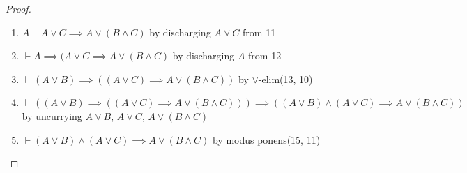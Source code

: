 \begin{proof}
\begin{enumerate}
\item $A\vdash A\lor C\implies A\lor(B\land C)$ by discharging $A\lor C$ from 11%
\item $\vdash A\implies(A\lor C\implies A\lor(B\land C)$ by
  discharging $A$ from 12%
\item $\vdash (A\lor B)\implies((A\lor C)\implies A\lor(B\land C))$ by
  $\lor$-elim(13, 10)%
\item $\vdash ((A\lor B)\implies((A\lor C)\implies A\lor(B\land C)))\implies((A\lor B)\land(A\lor C)\implies A\lor(B\land C))$
  by uncurrying $A\lor B$, $A\lor C$, $A\lor(B\land C)$%
\item $\vdash(A\lor B)\land(A\lor C)\implies A\lor(B\land C)$ by modus
  ponens(15, 11)\qedhere
\end{enumerate}
\end{proof}

